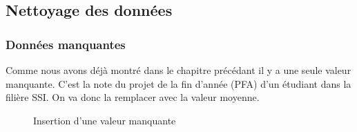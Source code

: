 \documentclass{article}
\begin{document}
            \subsection{Nettoyage des données}
            \subsubsection{Données manquantes}
            Comme nous avons déjà montré dans le chapitre précédant il y a une seule valeur manquante. C’est la note du projet de la fin d’année (PFA) d’un étudiant dans la filière SSI. On va donc la remplacer avec la valeur moyenne.
            \begin{figure}[h!]
                \centering
                \caption{Insertion d'une valeur manquante}
                \label{fig:14}
            \end{figure}    
\end{document}
